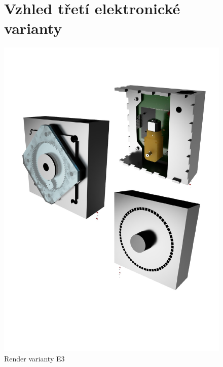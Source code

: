 \begin{figure}
    \section{Vzhled třetí elektronické varianty}
	\centering
	\includegraphics[width=\textwidth]{kapitoly/obrazky/E3/rendery.pdf}
	\caption{Render varianty E3}
	\label{fig:E3-renderi}
\end{figure}

